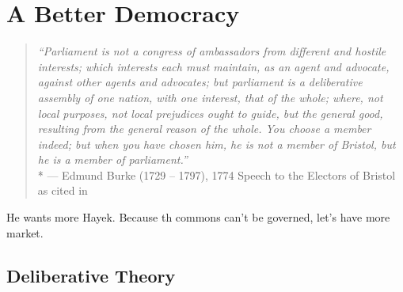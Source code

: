 
\chapter[Better Democracy]{A Better Democracy} \label{chap:better-democracy}

\begin{quote}
	\emph{``Parliament is not a congress of ambassadors from different and hostile interests;
which interests each must maintain, as an agent and advocate, against other agents and advocates;
but parliament is a deliberative assembly of one nation, with one interest, that of the whole;
where, not local purposes, not local prejudices ought to guide, but the general good, resulting from the general reason of the whole.
You choose a member indeed;
but when you have chosen him, he is not a member of Bristol, but he is a member of parliament.''}\\*
	--- Edmund Burke (1729 -- 1797), 1774 Speech to the Electors of Bristol as cited in \citep{Burke1886}
\end{quote}


He wants more Hayek.
Because th commons can't be governed, let's have more market.



\section{Deliberative Theory}



